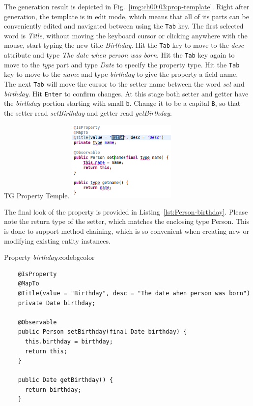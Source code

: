   The generation result is depicted in Fig.~\ref{img:ch00:03:prop-template}.
  Right after generation, the template is in edit mode, which means that all of its parts can be conveniently edited and navigated between using the \texttt{Tab} key.
  The first selected word is \emph{Title}, without moving the keyboard cursor or clicking anywhere with the mouse, start typing the new title \emph{Birthday}.
  Hit the \texttt{Tab} key to move to the \emph{desc} attribute and type \emph{The date when person was born}.
  Hit the \texttt{Tab} key again to move to the \emph{type} part and type \emph{Date} to specify the property type.
  Hit the \texttt{Tab} key to move to the \emph{name} and type \emph{birthday} to give the property a field name.
  The next \texttt{Tab} will move the cursor to the setter name between the word \emph{set} and \emph{birthday}.
  Hit \texttt{Enter} to confirm changes.
  At this stage both setter and getter have the \emph{birthday} portion starting with small \texttt{b}.
  Change it to be a capital \texttt{B}, so that the setter read \emph{setBirthday} and getter read \emph{getBirthday}.

  \begin{image}{TG Property Temple.}{\label{img:ch00:03:prop-template}}
    \includegraphics[width=0.4\textwidth]{parts/00-part/chapters/02-making-changes/images/03-birthday-property-template.png}
  \end{image}

  The final look of the property is provided in Listing~\ref{lst:Person-birthday}.
  Please note the return type of the setter, which matches the enclosing type Person.
  This is done to support method chaining, which is so convenient when creating new or modifying existing entity instances.

  \begin{code}{Property \emph{birthday}.}{\label{lst:Person-birthday}}{codebgcolor}
    \begin{lstlisting}
    @IsProperty
    @MapTo
    @Title(value = "Birthday", desc = "The date when person was born")
    private Date birthday;
    
    @Observable
    public Person setBirthday(final Date birthday) {
      this.birthday = birthday;
      return this;
    }
    
    public Date getBirthday() {
      return birthday;
    }
    \end{lstlisting}
  \end{code}


